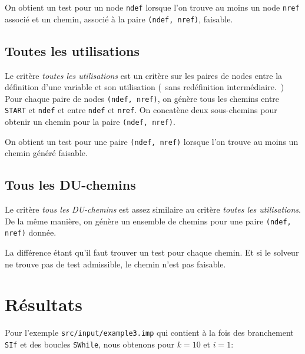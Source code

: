 On obtient un test pour un node \texttt{ndef} lorsque l'on trouve au moins un
node \texttt{nref} associé et un chemin, associé à la paire
\texttt{(ndef, nref)}, faisable.

\subsection{Toutes les utilisations}

Le critère \textit{toutes les utilisations} est un critère sur les paires de
nodes entre la définition d'une variable et son utilisation (~sans redéfinition
intermédiaire.~) Pour chaque paire de nodes \texttt{(ndef, nref)}, on génère
tous les chemins entre \texttt{START} et \texttt{ndef} et entre \texttt{ndef}
et \texttt{nref}. On concatène deux sous-chemins pour obtenir un chemin pour la
paire \texttt{(ndef, nref)}.

On obtient un test pour une paire \texttt{(ndef, nref)} lorsque l'on trouve au
moins un chemin généré faisable.

\subsection{Tous les DU-chemins}

Le critère \textit{tous les DU-chemins} est assez similaire au critère
\textit{toutes les utilisations}. De la même manière, on génère un ensemble de
chemins pour une paire \texttt{(ndef, nref)} donnée.

La différence étant qu'il faut trouver un test pour chaque chemin. Et si le
solveur ne trouve pas de test admissible, le chemin n'est pas faisable.

\section{Résultats}

Pour l'exemple \texttt{src/input/example3.imp} qui contient à la fois des
branchement \texttt{SIf} et des boucles \texttt{SWhile}, nous obtenons pour
$k = 10$ et $i = 1$:

\bigskip

